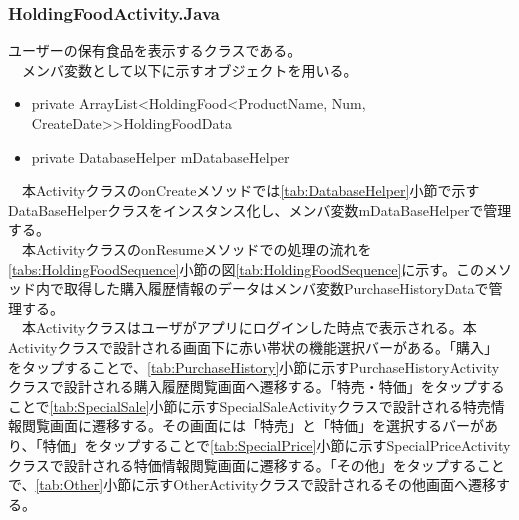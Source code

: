 \documentclass[a4j]{jarticle}
\begin{document}
\subsubsection{HoldingFoodActivity.Java}
\label{tab:HoldingFood}
ユーザーの保有食品を表示するクラスである。\\
　メンバ変数として以下に示すオブジェクトを用いる。
\begin{itemize}
\item private ArrayList\textless  HoldingFood\textless ProductName, Num, CreateDate\textgreater \textgreater  HoldingFoodData
\item private DatabaseHelper mDatabaseHelper
\end{itemize}
　本ActivityクラスのonCreateメソッドでは\ref{tab:DatabaseHelper}小節で示すDataBaseHelperクラスをインスタンス化し、メンバ変数mDataBaseHelperで管理する。\\
　本ActivityクラスのonResumeメソッドでの処理の流れを\ref{tabs:HoldingFoodSequence}小節の図\ref{tab:HoldingFoodSequence}に示す。このメソッド内で取得した購入履歴情報のデータはメンバ変数PurchaseHistoryDataで管理する。\\
　本Activityクラスはユーザがアプリにログインした時点で表示される。本Activityクラスで設計される画面下に赤い帯状の機能選択バーがある。「購入」をタップすることで、\ref{tab:PurchaseHistory}小節に示すPurchaseHistoryActivityクラスで設計される購入履歴閲覧画面へ遷移する。「特売・特価」をタップすることで\ref{tab:SpecialSale}小節に示すSpecialSaleActivityクラスで設計される特売情報閲覧画面に遷移する。その画面には「特売」と「特価」を選択するバーがあり、「特価」をタップすることで\ref{tab:SpecialPrice}小節に示すSpecialPriceActivityクラスで設計される特価情報閲覧画面に遷移する。「その他」をタップすることで、\ref{tab:Other}小節に示すOtherActivityクラスで設計されるその他画面へ遷移する。
\end{document}
